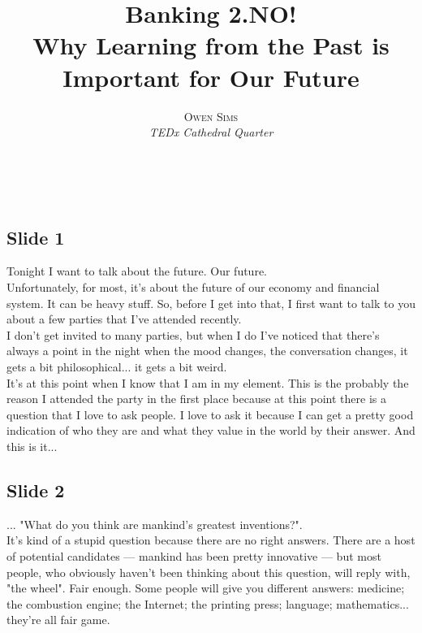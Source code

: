 \documentclass[a4paper, 11pt]{article} %
\title{\textbf{Banking 2.NO!}\\ %
Why Learning from the Past is Important for Our Future} %
\author{\textsc{Owen Sims} %
\\{\textit{TEDx Cathedral Quarter}}} %
\makeatletter
\renewcommand{\maketitle}{ %
\begin{flushleft} %
{\LARGE\@title} %

\vspace{50pt} %

{\large\@author} %
\\\@date %

\vspace{40pt} %
\end{flushleft}
}
\makeatother
\begin{document}
\maketitle %



\subsection*{Slide 1}

Tonight I want to talk about the future. Our future.\\

Unfortunately, for most, it's about the future of our economy and financial system. It can be heavy stuff. So, before I get into that, I first want to talk to you about a few parties that I've attended recently.\\

I don't get invited to many parties, but when I do I've noticed that there's always a point in the night when the mood changes, the conversation changes, it gets a bit philosophical... it gets a bit weird.\\

It's at this point when I know that I am in my element. This is the probably the reason I attended the party in the first place because at this point there is a question that I love to ask people. I love to ask it because I can get a pretty good indication of who they are and what they value in the world by their answer. And this is it...



\subsection*{Slide 2}

... "What do you think are mankind's greatest inventions?".\\

It's kind of a stupid question because there are no right answers. There are a host of potential candidates --- mankind has been pretty innovative --- but most people, who obviously haven't been thinking about this question, will reply with, "the wheel". Fair enough. Some people will give you different answers: medicine; the combustion engine; the Internet; the printing press; language; mathematics... they're all fair game.\\
\end{document}
